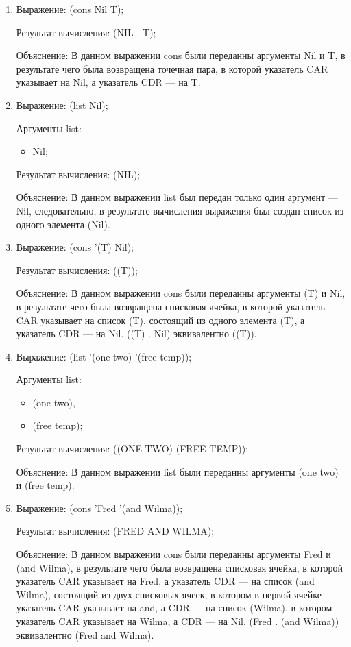 \documentclass[a4paper,oneside,14pt]{extarticle}
\begin{document}
\begin{enumerate}
    \item 
        Выражение: (cons Nil T);

        Результат вычисления: (NIL . T);

        Объяснение: В данном выражении cons были переданны аргументы Nil и T, в результате чего была возвращена точечная пара, в которой указатель CAR указывает на Nil, а указатель CDR --- на T.

    \item 
        Выражение: (list Nil);

        Аргументы list:
        \begin{itemize}
            \item Nil;
        \end{itemize}

        Результат вычисления: (NIL);

        Объяснение: В данном выражении list был передан только один аргумент --- Nil, следовательно, в результате вычисления выражения был создан список из одного элемента (Nil).

    \item 
        Выражение: (cons '(T) Nil);

        Результат вычисления: ((T));

        Объяснение: В данном выражении cons были переданны аргументы (T) и Nil, в результате чего была возвращена списковая ячейка, в которой указатель CAR указывает на список (T), состоящий из одного элемента (T), а указатель CDR --- на Nil. ((T) . Nil) эквивалентно ((T)).

    \item 
        Выражение: (list '(one two) '(free temp));

        Аргументы list:
        \begin{itemize}
            \item (one two),
            \item (free temp);
        \end{itemize}

        Результат вычисления: ((ONE TWO) (FREE TEMP));

        Объяснение: В данном выражении list были переданны аргументы (one two) и (free temp).

    \item 
        Выражение: (cons 'Fred '(and Wilma));

        Результат вычисления: (FRED AND WILMA);

        Объяснение: В данном выражении cons были переданны аргументы Fred и (and Wilma), в результате чего была возвращена списковая ячейка, в которой указатель CAR указывает на Fred, а указатель CDR --- на список (and Wilma), состоящий из двух списковых ячеек, в котором в первой ячейке указатель CAR указывает на and, а CDR --- на список (Wilma), в котором указатель CAR указывает на Wilma, а CDR --- на Nil. (Fred . (and Wilma)) эквивалентно (Fred and Wilma).


\end{enumerate}
\end{document}
